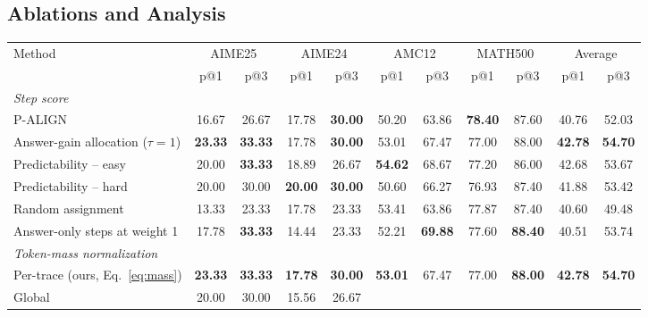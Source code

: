\documentclass[11pt]{article}
\newcommand{\uniformpalign}{P-ALIGN}
\begin{document}
\subsection{Ablations and Analysis}
\label{sec:analysis}

\begin{table}[!t]
  \centering
  \small
  \setlength{\tabcolsep}{4pt}
  \begin{tabular}{p{4.3cm}cccccccccc}
    \toprule
    \multirow{2}{*}{Method}
    & \multicolumn{2}{c}{AIME25}
    & \multicolumn{2}{c}{AIME24}
    & \multicolumn{2}{c}{AMC12}
    & \multicolumn{2}{c}{MATH500}
    & \multicolumn{2}{c}{Average} \\
    \cmidrule(lr){2-3}
    \cmidrule(lr){4-5}
    \cmidrule(lr){6-7}
    \cmidrule(lr){8-9}
    \cmidrule(lr){10-11}
    & p@1 & p@3 & p@1 & p@3 & p@1 & p@3
    & p@1 & p@3 & p@1 & p@3 \\
    \midrule
    \multicolumn{11}{l}{\textit{Step score}} \\
    \uniformpalign{}
    & 16.67 & 26.67
    & 17.78 & \textbf{30.00}
    & 50.20 & 63.86
    & \textbf{78.40} & 87.60
    & 40.76 & 52.03 \\
    Answer-gain allocation ($\tau=1$)
    & \textbf{23.33} & \textbf{33.33}
    & 17.78 & \textbf{30.00}
    & 53.01 & 67.47
    & 77.00 & 88.00
    & \textbf{42.78} & \textbf{54.70} \\
    Predictability -- easy
    & 20.00 & \textbf{33.33}
    & 18.89 & 26.67
    & \textbf{54.62} & 68.67
    & 77.20 & 86.00
    & 42.68 & 53.67 \\
    Predictability -- hard
    & 20.00 & 30.00
    & \textbf{20.00} & \textbf{30.00}
    & 50.60 & 66.27
    & 76.93 & 87.40
    & 41.88 & 53.42 \\
    Random assignment
    & 13.33 & 23.33
    & 17.78 & 23.33
    & 53.41 & 63.86
    & 77.87 & 87.40
    & 40.60 & 49.48 \\
    Answer-only steps at weight 1
    & 17.78 & \textbf{33.33}
    & 14.44 & 23.33
    & 52.21 & \textbf{69.88}
    & 77.60 & \textbf{88.40}
    & 40.51 & 53.74 \\
    \midrule
    \multicolumn{11}{l}{\textit{Token-mass normalization}} \\
    Per-trace (ours, Eq.~\ref{eq:mass})
    & \textbf{23.33} & \textbf{33.33}
    & \textbf{17.78} & \textbf{30.00}
    & \textbf{53.01} & 67.47
    & 77.00 & \textbf{88.00}
    & \textbf{42.78} & \textbf{54.70} \\
    Global
    & 20.00 & 30.00
    & 15.56 & 26.67

\end{tabular}
\end{table}
\end{document}
